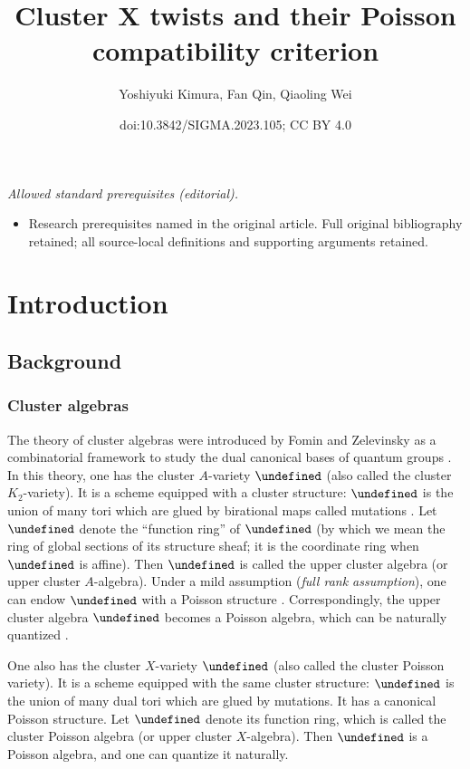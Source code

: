 \documentclass[10pt,a4paper]{amsart}
\title{Cluster X twists and their Poisson compatibility criterion}
\author{Yoshiyuki Kimura, Fan Qin, Qiaoling Wei}
\date{doi:10.3842/SIGMA.2023.105; CC BY 4.0}
\let\upClAlg\undefined
\let\XClAlg\undefined
\let\AVar\undefined
\let\XVar\undefined
\newcommand{\upClAlg}{\mathcal{U}^A}
\newcommand{\XClAlg}{\mathcal{U}^X}
\newcommand{\AVar}{\mathbb{A}}
\newcommand{\XVar}{\mathbb{X}}
\numberwithin{equation}{section}
\begin{document}
\maketitle
\noindent\textit{Allowed standard prerequisites (editorial).}\begin{itemize}
\item Research prerequisites named in the original article. Full original bibliography retained; all source-local definitions and supporting arguments retained.
\end{itemize}\medskip
\section{Introduction}\label{sec:intro}

\subsection{Background}

\subsubsection*{Cluster algebras}

The theory of cluster algebras were introduced by Fomin and Zelevinsky
\cite{FominZelevinsky02} as a combinatorial framework to study the
dual canonical bases of quantum groups \cite{Kas:crystal,Lusztig90,Lusztig91}. In this theory, one has the cluster $A$-variety
$\AVar$ (also called the cluster $K_{2}$-variety). It is a scheme
equipped with a cluster structure: $\AVar$ is the union of many tori
which are glued by birational maps called mutations \cite{gross2013birational}.
Let $\upClAlg$ denote the ``function ring'' of $\AVar$ (by which
we mean the ring of global sections of its structure sheaf; it is
the coordinate ring when $\AVar$ is affine). Then $\upClAlg$ is
called the upper cluster algebra (or upper cluster $A$-algebra).
Under a mild assumption (\emph{full rank assumption}), one can endow
$\AVar$ with a Poisson structure \cite{GekhtmanShapiroVainshtein03,GekhtmanShapiroVainshtein05}.
Correspondingly, the upper cluster algebra $\upClAlg$ becomes a Poisson
algebra, which can be naturally quantized \cite{BerensteinZelevinsky05}.

One also has the cluster $X$-variety $\XVar$ (also called the cluster
Poisson variety). It is a scheme equipped with the same cluster structure:
$\XVar$ is the union of many dual tori which are glued by mutations.
It has a canonical Poisson structure. Let $\XClAlg$ denote its function
ring, which is called the cluster Poisson algebra (or upper cluster
$X$-algebra). Then $\XClAlg$ is a Poisson algebra, and one can quantize
it naturally.
\end{document}
